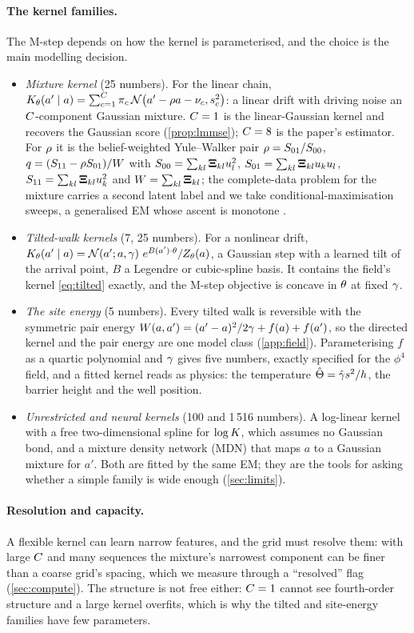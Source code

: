 \paragraph{The kernel families.}
The M-step depends on how the kernel is parameterised, and the choice is the main modelling decision.
\begin{itemize}[leftmargin=1.2em,itemsep=0.1em,topsep=0.2em]
\item \emph{Mixture kernel} (25 numbers). For the linear chain,
$K_{\theta}(a'\mid a)=\sum_{c=1}^{C}\pi_c\,\mathcal{N}\!\left(a'-\rho a-\nu_c,s_c^2\right)$: a linear drift with
driving noise an $C$-component Gaussian mixture. $C=1$ is the linear-Gaussian kernel and recovers
the Gaussian score (\cref{prop:lmmse}); $C=8$ is the paper's estimator. For $\rho$ it is the
belief-weighted Yule--Walker pair $\rho=S_{01}/S_{00}$, $q=(S_{11}-\rho S_{01})/W$ with
$S_{00}=\sum_{kl}\mathbf{\Xi}_{kl}u_{l}^2$, $S_{01}=\sum_{kl}\mathbf{\Xi}_{kl}u_{k}u_{l}$,
$S_{11}=\sum_{kl}\mathbf{\Xi}_{kl}u_{k}^2$ and $W=\sum_{kl}\mathbf{\Xi}_{kl}$; the complete-data problem for the
mixture carries a second latent label and we take conditional-maximisation sweeps, a generalised EM
whose ascent is monotone \citep{dempster1977maximum,meng1993maximum}.
\item \emph{Tilted-walk kernels} (7, 25 numbers). For a nonlinear drift,
$K_{\theta}(a'\mid a)=\mathcal{N}\!\left(a';a,\gamma\right)\,e^{B(a')\cdot\theta}/Z_\theta(a)$, a Gaussian step with a
learned tilt of the arrival point, $B$ a Legendre or cubic-spline basis. It contains the field's kernel
\cref{eq:tilted} exactly, and the M-step objective is concave in $\theta$ at fixed $\gamma$.
\item \emph{The site energy} (5 numbers). Every tilted walk is reversible with the symmetric pair energy
$W(a,a')=(a'-a)^2/2\gamma+f(a)+f(a')$, so the directed kernel and the pair energy are one model class
(\cref{app:field}). Parameterising $f$ as a quartic polynomial and $\gamma$ gives five numbers,
exactly specified for the $\phi^4$ field, and a fitted kernel reads as physics: the temperature
$\hat{\Theta}=\hat{\gamma} s^2/h$, the barrier height and the well position.
\item \emph{Unrestricted and neural kernels} (100 and 1\,516 numbers). A log-linear kernel with a free
two-dimensional spline for $\log K$, which assumes no Gaussian bond, and a mixture density network
(MDN) that maps $a$ to a Gaussian mixture for $a'$. Both are fitted by the same EM; they are the tools for
asking whether a simple family is wide enough (\cref{sec:limits}).
\end{itemize}

\paragraph{Resolution and capacity.}
A flexible kernel can learn narrow features, and the grid must resolve them: with large $C$ and many
sequences the mixture's narrowest component can be finer than a coarse grid's spacing, which we measure
through a ``resolved'' flag (\cref{sec:compute}). The structure is not free either: $C=1$ cannot see
fourth-order structure and a large kernel overfits, which is why the tilted and site-energy families have
few parameters.
